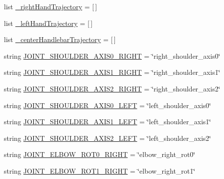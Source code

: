 \begin{DoxyCompactItemize}
list \mbox{\hyperlink{namespacesteering__capture__trajectory_a6e472bbc80a1fe9fdef6f47fc2a8a293}{\+\_\+right\+Hand\+Trajectory}} = \mbox{[}$\,$\mbox{]}
\item 
list \mbox{\hyperlink{namespacesteering__capture__trajectory_ab146d64ecd2285e3e13afb4f4fea71cb}{\+\_\+left\+Hand\+Trajectory}} = \mbox{[}$\,$\mbox{]}
\item 
list \mbox{\hyperlink{namespacesteering__capture__trajectory_a55a17426a785d2ad94175536591c69f4}{\+\_\+center\+Handlebar\+Trajectory}} = \mbox{[}$\,$\mbox{]}
\item 
string \mbox{\hyperlink{namespacesteering__capture__trajectory_abe1b65eead7e08263756bbd4cb8a707d}{J\+O\+I\+N\+T\+\_\+\+S\+H\+O\+U\+L\+D\+E\+R\+\_\+\+A\+X\+I\+S0\+\_\+\+R\+I\+G\+HT}} = \char`\"{}right\+\_\+shoulder\+\_\+axis0\char`\"{}
\item 
string \mbox{\hyperlink{namespacesteering__capture__trajectory_a3b6aa5c2f42555acc357dcb41432db77}{J\+O\+I\+N\+T\+\_\+\+S\+H\+O\+U\+L\+D\+E\+R\+\_\+\+A\+X\+I\+S1\+\_\+\+R\+I\+G\+HT}} = \char`\"{}right\+\_\+shoulder\+\_\+axis1\char`\"{}
\item 
string \mbox{\hyperlink{namespacesteering__capture__trajectory_a841fea8b243a2e4049b07e3cc00a0c16}{J\+O\+I\+N\+T\+\_\+\+S\+H\+O\+U\+L\+D\+E\+R\+\_\+\+A\+X\+I\+S2\+\_\+\+R\+I\+G\+HT}} = \char`\"{}right\+\_\+shoulder\+\_\+axis2\char`\"{}
\item 
string \mbox{\hyperlink{namespacesteering__capture__trajectory_ad30756335b25d2f1fb3b98e6a4bf8cab}{J\+O\+I\+N\+T\+\_\+\+S\+H\+O\+U\+L\+D\+E\+R\+\_\+\+A\+X\+I\+S0\+\_\+\+L\+E\+FT}} = \char`\"{}left\+\_\+shoulder\+\_\+axis0\char`\"{}
\item 
string \mbox{\hyperlink{namespacesteering__capture__trajectory_a54818ddd4d017c6522d3e96954fb159d}{J\+O\+I\+N\+T\+\_\+\+S\+H\+O\+U\+L\+D\+E\+R\+\_\+\+A\+X\+I\+S1\+\_\+\+L\+E\+FT}} = \char`\"{}left\+\_\+shoulder\+\_\+axis1\char`\"{}
\item 
string \mbox{\hyperlink{namespacesteering__capture__trajectory_a780be349a5eba30cb1fba8abd268b756}{J\+O\+I\+N\+T\+\_\+\+S\+H\+O\+U\+L\+D\+E\+R\+\_\+\+A\+X\+I\+S2\+\_\+\+L\+E\+FT}} = \char`\"{}left\+\_\+shoulder\+\_\+axis2\char`\"{}
\item 
string \mbox{\hyperlink{namespacesteering__capture__trajectory_ad414d7681442881809e88669682c9805}{J\+O\+I\+N\+T\+\_\+\+E\+L\+B\+O\+W\+\_\+\+R\+O\+T0\+\_\+\+R\+I\+G\+HT}} = \char`\"{}elbow\+\_\+right\+\_\+rot0\char`\"{}
\item 
string \mbox{\hyperlink{namespacesteering__capture__trajectory_adc7a9860e1833cf7a4a16daea07f766f}{J\+O\+I\+N\+T\+\_\+\+E\+L\+B\+O\+W\+\_\+\+R\+O\+T1\+\_\+\+R\+I\+G\+HT}} = \char`\"{}elbow\+\_\+right\+\_\+rot1\char`\"{}

\end{DoxyCompactItemize}
